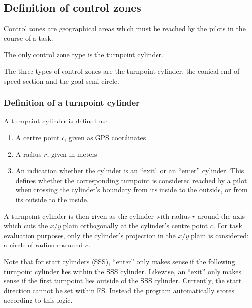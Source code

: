 \documentclass{article}
\begin{document}
\subsection{Definition of control zones}
Control zones are geographical areas which must be reached by the pilots in the
course of a task.

\begin{hg}
The only control zone type is the turnpoint cylinder.
\end{hg}

\begin{pg}
The three types of control zones are the turnpoint cylinder, the conical end of
speed section and the goal semi-circle.
\end{pg}

\subsubsection{Definition of a turnpoint cylinder}
A turnpoint cylinder is defined as:
\begin{enumerate}
    \item A centre point \(c\), given as GPS coordinates
    \item A radius \(r\), given in meters
    \item
        An indication whether the cylinder is an “exit” or an “enter” cylinder.
        This defines whether the corresponding turnpoint is considered reached
        by a pilot when crossing the cylinder’s boundary from its inside to the
        outside, or from its outside to the inside.
\end{enumerate}

A turnpoint cylinder is then given as the cylinder with radius \(r\) around the
axis which cuts the \(x/y\) plain orthogonally at the cylinder’s centre point
\(c\).  For task evaluation purposes, only the cylinder’s projection in the
\(x/y\) plain is considered: a circle of radius \(r\) around \(c\).

Note that for start cylinders (SSS), “enter” only makes sense if the following
turnpoint cylinder lies within the SSS cylinder. Likewise, an “exit” only makes
sense if the first turnpoint lies outside of the SSS cylinder. Currently, the
start direction cannot be set within FS. Instead the program automatically
scores according to this logic.
\end{document}
